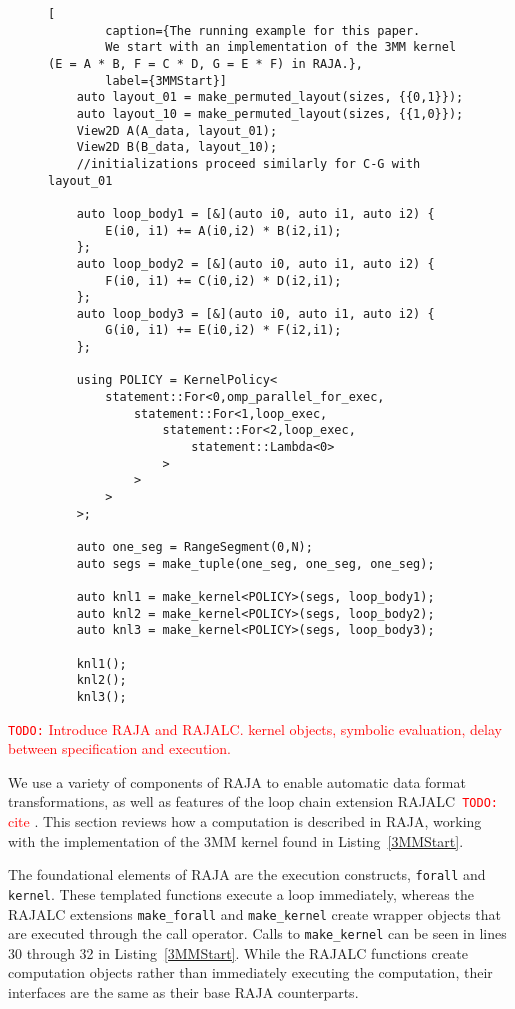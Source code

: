 \documentclass[sigconf, table]{acmart}
\newcommand{\todo}[1]{{\textcolor{red}{{\tt{TODO:}}\,\,#1 }}}
\begin{document}
\begin{figure}
	\begin{lstlisting}[
		caption={The running example for this paper. 
		We start with an implementation of the 3MM kernel (E = A * B, F = C * D, G = E * F) in RAJA.},
		label={3MMStart}]
	auto layout_01 = make_permuted_layout(sizes, {{0,1}});
	auto layout_10 = make_permuted_layout(sizes, {{1,0}});
	View2D A(A_data, layout_01);
	View2D B(B_data, layout_10);
	//initializations proceed similarly for C-G with layout_01

	auto loop_body1 = [&](auto i0, auto i1, auto i2) {
		E(i0, i1) += A(i0,i2) * B(i2,i1);
	};
	auto loop_body2 = [&](auto i0, auto i1, auto i2) {
		F(i0, i1) += C(i0,i2) * D(i2,i1);
	};
	auto loop_body3 = [&](auto i0, auto i1, auto i2) {
		G(i0, i1) += E(i0,i2) * F(i2,i1);
	};
	
	using POLICY = KernelPolicy<
		statement::For<0,omp_parallel_for_exec,
			statement::For<1,loop_exec,
				statement::For<2,loop_exec,
					statement::Lambda<0>
				>
			>
		>
	>;

	auto one_seg = RangeSegment(0,N);
	auto segs = make_tuple(one_seg, one_seg, one_seg);

	auto knl1 = make_kernel<POLICY>(segs, loop_body1);
	auto knl2 = make_kernel<POLICY>(segs, loop_body2);
	auto knl3 = make_kernel<POLICY>(segs, loop_body3);

	knl1();
	knl2();
	knl3();
	\end{lstlisting}
\end{figure}

\todo{Introduce RAJA and RAJALC. kernel objects, symbolic evaluation, delay between specification and execution.}

We use a variety of components of RAJA to enable automatic data format transformations, as well as features of the loop chain extension RAJALC~\todo{cite}. 
This section reviews how a computation is described in RAJA, working with the implementation of the 3MM kernel found in Listing~\ref{3MMStart}.

The foundational elements of RAJA are the execution constructs, \verb.forall. and \verb.kernel.. 
These templated functions execute a loop immediately, whereas the RAJALC extensions \verb.make_forall. and \verb.make_kernel. create wrapper objects that are executed through the call operator. 
Calls to \verb.make_kernel. can be seen in lines 30 through 32 in Listing~\ref{3MMStart}. 
While the RAJALC functions create computation objects rather than immediately executing the computation, their interfaces are the same as their base RAJA counterparts.
\end{document}
